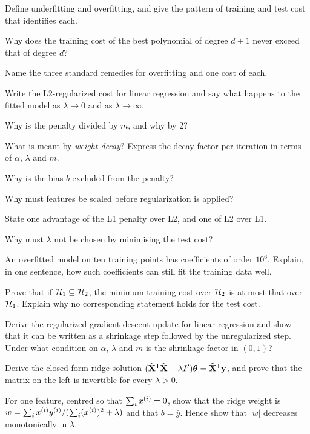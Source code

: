 
\sq Define underfitting and overfitting, and give the pattern of training and
test cost that identifies each.

\sq Why does the training cost of the best polynomial of degree $d+1$ never
exceed that of degree $d$?

\sq Name the three standard remedies for overfitting and one cost of each.

\sq Write the L2-regularized cost for linear regression and say what happens to
the fitted model as $\lambda \to 0$ and as $\lambda \to \infty$.

\sq Why is the penalty divided by $m$, and why by $2$?

\sq What is meant by \emph{weight decay}? Express the decay factor per iteration
in terms of $\alpha$, $\lambda$ and $m$.

\sq Why is the bias $b$ excluded from the penalty?

\sq Why must features be scaled before regularization is applied?

\sq State one advantage of the L1 penalty over L2, and one of L2 over L1.

\sq Why must $\lambda$ not be chosen by minimising the test cost?

\sq An overfitted model on ten training points has coefficients of order
$10^6$. Explain, in one sentence, how such coefficients can still fit the
training data well.


\ap Prove that if $\mathcal{H}_1 \subseteq \mathcal{H}_2$, the minimum training cost over
$\mathcal{H}_2$ is at most that over $\mathcal{H}_1$. Explain why no corresponding
statement holds for the test cost.

\ap Derive the regularized gradient-descent update for linear regression and
show that it can be written as a shrinkage step followed by the unregularized
step. Under what condition on $\alpha$, $\lambda$ and $m$ is the shrinkage
factor in $(0,1)$?

\ap Derive the closed-form ridge solution
$(\tilde{\mathbf{X}}^{\mathsf{T}}\tilde{\mathbf{X}} + \lambda I')\boldsymbol\theta =
\tilde{\mathbf{X}}^{\mathsf{T}}\mathbf{y}$, and prove that the matrix on the left is invertible
for every $\lambda > 0$.

\ap For one feature, centred so that $\sum_i x^{(i)} = 0$, show that the ridge
weight is $w = \sum_ix^{(i)}y^{(i)}/(\sum_i(x^{(i)})^2 + \lambda)$ and that
$b = \bar y$. Hence show that $|w|$ decreases monotonically in $\lambda$.

